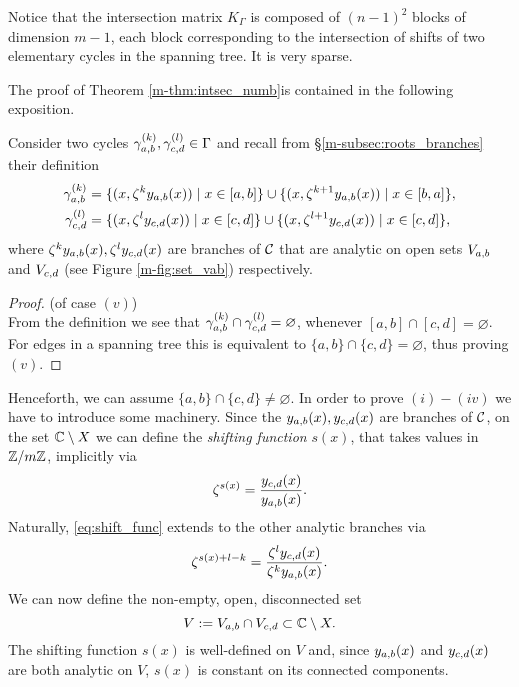 \documentclass[main.tex]{subfiles}
\begin{document}
 \begin{rmk}
     Notice that the intersection matrix $K_{\Gamma}$ is composed of
  $(n-1)^2$ blocks of dimension $m-1$, each block corresponding to the intersection
  of shifts of two elementary cycles in the spanning tree. It is very sparse.
 \end{rmk}


 \bigskip
 The proof of Theorem \ref{m-thm:intsec_numb}is contained in the following exposition.
 \bigskip

  Consider
  two cycles $\gamma_{a,b}^{(k)},\gamma_{c,d}^{(l)} \in \Gamma$ and
  recall from \S \ref{m-subsec:roots_branches} their definition 
   \begin{align*}
      \gamma_{a,b}^{(k)} & = \{  (x,\zeta^k y_{a,b}(x))  \mid  x \in [a,b]  \} \cup \{  (x,\zeta^{k+1} y_{a,b}(x))  \mid  x \in [b,a]  \}, \\
      \gamma_{c,d}^{(l)} & = \{  (x,\zeta^l y_{c,d}(x))  \mid  x \in [c,d]  \} \cup \{  (x,\zeta^{l+1} y_{c,d}(x))  \mid  x \in [c,d]  \},
   \end{align*}
  where $\zeta^ky_{a,b}(x),\zeta^ly_{c,d}(x)$ are branches of $\mathcal{C}$ that are analytic on open sets $V_{a,b}$ and $V_{c,d}$ 
  (see Figure \ref{m-fig:set_vab}) respectively.

  \begin{proof}\let\qed\relax (of case $(v)$) \\
  From the definition we see that $\gamma_{a,b}^{(k)} \cap \gamma_{c,d}^{(l)} = \varnothing$, whenever $[a,b] \cap [c,d] = \varnothing$. For edges in a spanning tree
  this is equivalent to $\{a,b\} \cap \{c,d\} = \varnothing$, thus
  proving $(v)$.
  \end{proof}

   Henceforth, we can assume $\{a,b\} \cap \{c,d\} \ne \varnothing$. In order to prove $(i)-(iv)$ we have to introduce some machinery. Since the $y_{a,b}(x),y_{c,d}(x)$ are branches of $\mathcal{C}$,
   on the set $\mathbb{C} \setminus X$
   we can define the \emph{shifting function}
   $s(x)$, that takes values in $\mathbb{Z}/m\mathbb{Z}$, implicitly via
  \begin{equation}\label{eq:shift_func}
   \zeta^{s(x)} = \frac{y_{c,d}(x)}{y_{a,b}(x)}.
   \end{equation}
  Naturally, \eqref{eq:shift_func} extends to the other analytic branches via
  \begin{equation*}
   \zeta^{s(x)+l-k} = \frac{\zeta^ly_{c,d}(x)}{\zeta^ky_{a,b}(x)}.
   \end{equation*}
   We can now define the non-empty, open, disconnected set
   \begin{equation*}
    V := V_{a,b} \cap V_{c,d} \subset \mathbb{C} \setminus X.
   \end{equation*}
 The shifting function $s(x)$ is well-defined on $V$ and, since $y_{a,b}(x)$ and $y_{c,d}(x)$ are 
  both analytic on $V$, $s(x)$ is constant on its 
  connected components.
  
\end{document}
